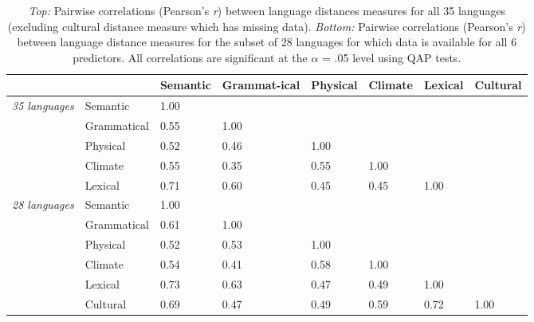 \documentclass[9pt,twoside,lineno]{pnas-new}
\begin{document}
\begin{table}[h]
\centering
\begin{tabular}{llp{1.5cm}p{1.8cm}p{1.3cm}p{1.3cm}p{1.3cm}p{1.3cm}}

  & &  Semantic   &  Grammat-ical   &  Physical   &  Climate  &  Lexical    &  Cultural  \\ 
  \hline
    \hline
{\it 35 languages} & Semantic  & 1.00 & & &  & \\ 
& Grammatical  & 0.55 & 1.00 &  & & \\ 
& Physical  & 0.52 & 0.46 & 1.00 &  & \\ 
& Climate  & 0.55 & 0.35 & 0.55 & 1.00 & \\ 
& Lexical  & 0.71 & 0.60 & 0.45 & 0.45 & 1.00 \\ 
   \hline
{\it 28 languages} &   Semantic  & 1.00 &  &  & &  & \\ 
 &Grammatical  & 0.61 & 1.00 &  &&  & \\ 
&Physical  & 0.52 & 0.53 & 1.00 & & &\\ 
& Climate  & 0.54 & 0.41 & 0.58 & 1.00  &  &\\ 
&  Lexical  & 0.73 & 0.63 & 0.47 & 0.49& 1.00 & \\
&    Cultural  & 0.69 & 0.47 & 0.49 & 0.59 & 0.72  & 1.00\\ 
      \hline
        \hline
\end{tabular}
   \caption{ {\it Top:} Pairwise correlations (Pearson's {\it r}) between language distances measures for all 35 languages (excluding cultural distance measure which has  missing data). {\it Bottom:} Pairwise correlations (Pearson's {\it r}) between language distance measures for the subset of 28 languages for which data is available for all 6 predictors. All correlations are significant at the $\alpha$ = .05 level using QAP tests.} 
\end{table}

\pagebreak
 \clearpage


\FloatBarrier





\pagebreak
 \clearpage
 

\end{document}
